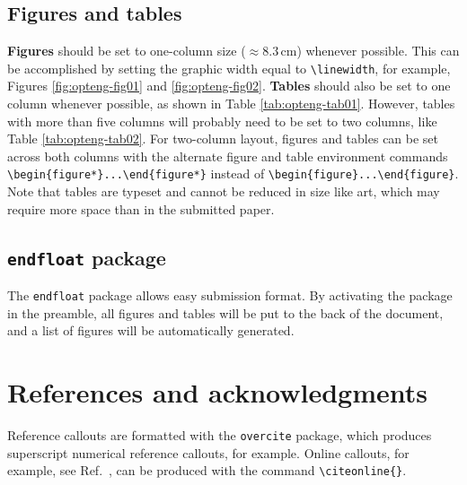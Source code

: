 \documentclass[10pt,letterpaper,optenglett,fleqn]{article}      %
\begin{document}
\subsection{Figures and tables}

\textbf{Figures} should be set to one-column size ($\approx 8.3\,
\text{cm}$) whenever possible. This can be accomplished by setting
the graphic width equal to \verb+\linewidth+, for example, Figures
\ref{fig:opteng-fig01} and \ref{fig:opteng-fig02}. \textbf{Tables}
should also be set to one column whenever possible, as shown in
Table \ref{tab:opteng-tab01}. However, tables with more than five
columns will probably need to be set to two columns, like Table
\ref{tab:opteng-tab02}. For two-column layout, figures and tables
can be set across both columns with the alternate figure and table
environment commands \verb+\begin{figure*}...\end{figure*}+ instead
of \verb+\begin{figure}...\end{figure}+. Note that tables are
typeset and cannot be reduced in size like art, which may require
more space than in the submitted paper.

\subsection{\texttt{endfloat} package}

The \texttt{endfloat} package allows easy submission format. By
activating the package in the preamble, all figures and tables will
be put to the back of the document, and a list of figures will be
automatically generated.



\section{References and acknowledgments}

Reference callouts are formatted with the \texttt{overcite} package,
which produces superscript numerical reference callouts, for
example\cite{egan2006a}. Online callouts, for example, see
Ref.~, can be produced with the command
\verb+\citeonline{}+.
\end{document}
